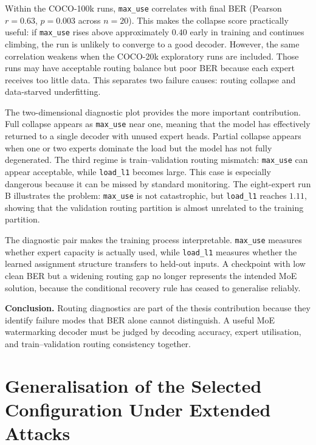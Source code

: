 ﻿\documentclass[12pt, a4paper, twoside]{report}
\numberwithin{equation}{chapter}
\begin{document}
Within the COCO-100k runs, \texttt{max\_use} correlates with final BER (Pearson $r=0.63$, $p=0.003$ across $n=20$). This makes the collapse score practically useful: if \texttt{max\_use} rises above approximately $0.40$ early in training and continues climbing, the run is unlikely to converge to a good decoder. However, the same correlation weakens when the COCO-20k exploratory runs are included. Those runs may have acceptable routing balance but poor BER because each expert receives too little data. This separates two failure causes: routing collapse and data-starved underfitting.

The two-dimensional diagnostic plot provides the more important contribution. Full collapse appears as \texttt{max\_use} near one, meaning that the model has effectively returned to a single decoder with unused expert heads. Partial collapse appears when one or two experts dominate the load but the model has not fully degenerated. The third regime is train--validation routing mismatch: \texttt{max\_use} can appear acceptable, while \texttt{load\_l1} becomes large. This case is especially dangerous because it can be missed by standard monitoring. The eight-expert run B illustrates the problem: \texttt{max\_use} is not catastrophic, but \texttt{load\_l1} reaches $1.11$, showing that the validation routing partition is almost unrelated to the training partition.

The diagnostic pair makes the training process interpretable. \texttt{max\_use} measures whether expert capacity is actually used, while \texttt{load\_l1} measures whether the learned assignment structure transfers to held-out inputs. A checkpoint with low clean BER but a widening routing gap no longer represents the intended MoE solution, because the conditional recovery rule has ceased to generalise reliably.

\textbf{Conclusion.} Routing diagnostics are part of the thesis contribution because they identify failure modes that BER alone cannot distinguish. A useful MoE watermarking decoder must be judged by decoding accuracy, expert utilisation, and train--validation routing consistency together.

\section{Generalisation of the Selected Configuration Under Extended Attacks}
\label{sec:waves-survey}
\end{document}
